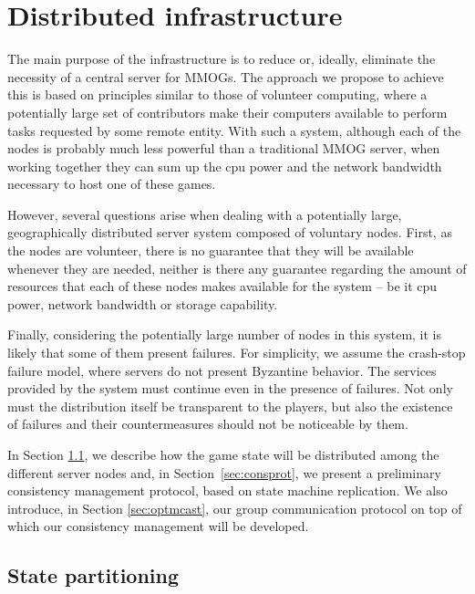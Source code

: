 \documentclass[]{usiinfprospectus}
\begin{document}
\section{Distributed infrastructure} \label{sec:distserver}

The main purpose of the infrastructure is to reduce or, ideally, eliminate the necessity of a central server for MMOGs. The approach we propose to achieve this is based on principles similar to those of volunteer computing, where a potentially large set of contributors make their computers available to perform tasks requested by some remote entity. With such a system, although each of the nodes is probably much less powerful than a traditional MMOG server, when working together they can sum up the cpu power and the network bandwidth necessary to host one of these games.

However, several questions arise when dealing with a potentially large, geographically distributed server system composed of voluntary nodes. First, as the nodes are volunteer, there is no guarantee that they will be available whenever they are needed, neither is there any guarantee regarding the amount of resources that each of these nodes makes available for the system -- be it cpu power, network bandwidth or storage capability.%

Finally, considering the potentially large number of nodes in this system, it is likely that some of them present failures. For simplicity, we assume the crash-stop failure model, where servers do not present Byzantine behavior. The services provided by the system must continue even in the presence of failures. Not only must the distribution itself be transparent to the players, but also the existence of failures and their countermeasures should not be noticeable by them.

In Section \ref{sec:statepart}, we describe how the game state will be distributed among the different server nodes and, in \mbox{Section \ref{sec:consprot}}, we present a preliminary consistency management protocol, based on state machine replication. We also introduce, in Section \ref{sec:optmcast}, our group communication protocol on top of which our consistency management will be developed.

\subsection{State partitioning} \label{sec:statepart}
\end{document}
